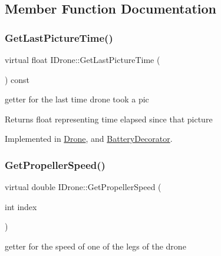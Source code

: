 \subsection{Member Function Documentation}
\mbox{\label{classIDrone_a112d19971ac7d94dba9e2f25ad667c0d}} 
\subsubsection{\texorpdfstring{Get\+Last\+Picture\+Time()}{GetLastPictureTime()}}
{\footnotesize\ttfamily virtual float I\+Drone\+::\+Get\+Last\+Picture\+Time (\begin{DoxyParamCaption}{ }\end{DoxyParamCaption}) const\hspace{0.3cm}{\ttfamily [pure virtual]}}



getter for the last time drone took a pic 

\begin{DoxyReturn}{Returns}
float representing time elapsed since that picture 
\end{DoxyReturn}


Implemented in \hyperlink{classDrone_a78de3dcbc6ae754e8874a8b65e8cd9ee}{Drone}, and \hyperlink{classBatteryDecorator_a661b3722c37ce7d9690e50724eac863e}{Battery\+Decorator}.

\mbox{\label{classIDrone_a60a9a7eb90bf13100d66cb47b99830ed}} 
\subsubsection{\texorpdfstring{Get\+Propeller\+Speed()}{GetPropellerSpeed()}}
{\footnotesize\ttfamily virtual double I\+Drone\+::\+Get\+Propeller\+Speed (\begin{DoxyParamCaption}\item[{int}]{index }\end{DoxyParamCaption})\hspace{0.3cm}{\ttfamily [pure virtual]}}



getter for the speed of one of the legs of the drone 

